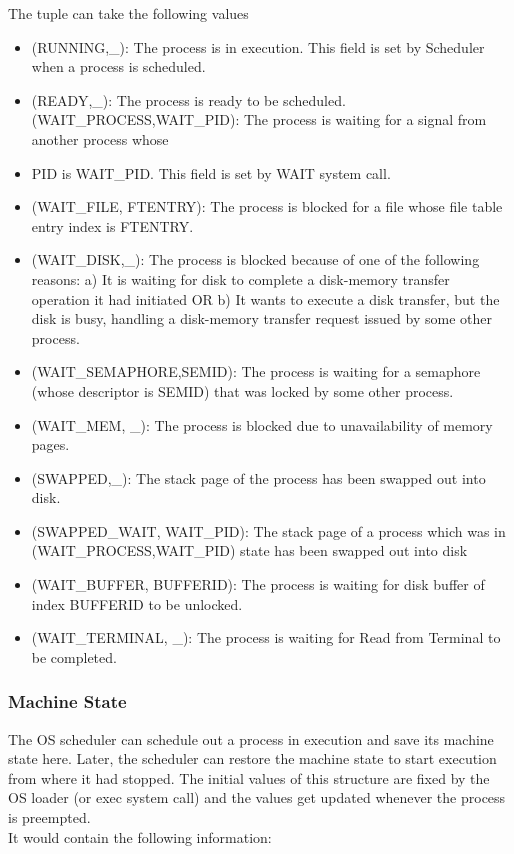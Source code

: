 The tuple can take the following values
\\
\begin {itemize}

\item (RUNNING,\_): The process is in execution. This field is set by Scheduler when a process is scheduled.
\item (READY,\_): The process is ready to be scheduled.
(WAIT\_PROCESS,WAIT\_PID): The process is waiting for a signal from another process whose \item PID is WAIT\_PID. This field is set by WAIT system call.
\item (WAIT\_FILE, FTENTRY): The process is blocked for a file whose file table entry index is FTENTRY.
\item (WAIT\_DISK,\_): The process is blocked because of one of the following reasons: a) It is waiting for disk to complete a disk-memory transfer operation it had initiated OR b) It wants to execute a disk transfer, but the disk is busy, handling a disk-memory transfer request issued by some other process.
\item (WAIT\_SEMAPHORE,SEMID): The process is waiting for a semaphore (whose descriptor is SEMID) that was locked by some other process.
\item (WAIT\_MEM, \_): The process is blocked due to unavailability of memory pages.
\item (SWAPPED,\_): The stack page of the process has been swapped out into disk.
\item (SWAPPED\_WAIT, WAIT\_PID): The stack page of a process which was in (WAIT\_PROCESS,WAIT\_PID) state has been swapped out into disk
\item (WAIT\_BUFFER, BUFFERID): The process is waiting for disk buffer of index BUFFERID to be unlocked.
\item (WAIT\_TERMINAL, \_): The process is waiting for Read from Terminal to be completed.

\end {itemize}

\subsubsection {Machine State}

The OS scheduler can schedule out a process in execution and save its machine state here. Later, the scheduler can restore the machine state to start execution from where it had stopped. The initial values of this structure are fixed by the OS loader (or exec system call) and the values get updated whenever the process is preempted.
\\
 It would contain the following information:

